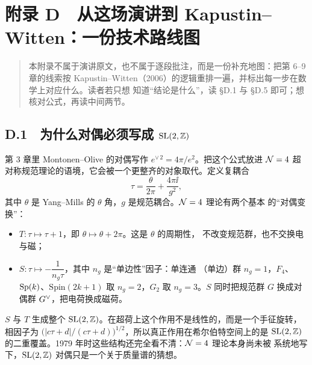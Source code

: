 \clearpage
{}
\section*{附录 D　从这场演讲到 Kapustin--Witten：一份技术路线图}
\setcounter{equation}{0}\setcounter{figure}{0}\setcounter{table}{0}
\renewcommand{\theequation}{D.\arabic{equation}}
\renewcommand{\thefigure}{D.\arabic{figure}}
\renewcommand{\thetable}{D.\arabic{table}}

\begin{quote}
\small
本附录不属于演讲原文，也不属于逐段批注，而是一份补充地图：把第 6--9 章的线索按
Kapustin--Witten（2006）的逻辑重排一遍，并标出每一步在数学上对应什么。读者若只想
知道“结论是什么”，读 \S D.1 与 \S D.5 即可；想核对公式，再读中间两节。
\end{quote}

\subsection*{D.1　为什么对偶必须写成 $\operatorname{SL}(2,\mathbb{Z})$}

第 3 章里 Montonen--Olive 的对偶写作 $e^{\vee\,2}=4\pi/e^{2}$。把这个公式放进
$\mathcal{N}=4$ 超对称规范理论的语境，它会被一个更整齐的对象取代。定义复耦合
\begin{equation}
  \tau=\frac{\theta}{2\pi}+\frac{4\pi\ii}{g^{2}},
  \label{eq:tau}
\end{equation}
其中 $\theta$ 是 Yang--Mills 的 $\theta$ 角，$g$ 是规范耦合。$\mathcal{N}=4$ 理论有两个基本
的“对偶变换”：
\begin{itemize}
  \item $T:\tau\mapsto\tau+1$，即 $\theta\mapsto\theta+2\pi$。这是 $\theta$ 的周期性，
        不改变规范群，也不交换电与磁；
  \item $S:\tau\mapsto-\dfrac{1}{n_g\tau}$，其中 $n_g$ 是“单边性”因子：单连通
        （单边）群 $n_g=1$，$F_4$、$\operatorname{Sp}(k)$、$\mathrm{Spin}(2k+1)$ 取 $n_g=2$，$G_2$ 取
        $n_g=3$。$S$ 同时把规范群 $G$ 换成对偶群 $G^{\vee}$，把电荷换成磁荷。
\end{itemize}
$S$ 与 $T$ 生成整个 $\operatorname{SL}(2,\mathbb{Z})$。在超荷上这个作用不是线性的，而是一个手征旋转，
相因子为 $\bigl(|c\tau+d|/(c\tau+d)\bigr)^{1/2}$，所以真正作用在希尔伯特空间上的是
$\operatorname{SL}(2,\mathbb{Z})$ 的二重覆盖。1979 年时这些结构还完全看不清：$\mathcal{N}=4$ 理论本身尚未被
系统地写下，$\operatorname{SL}(2,\mathbb{Z})$ 对偶只是一个关于质量谱的猜想。

